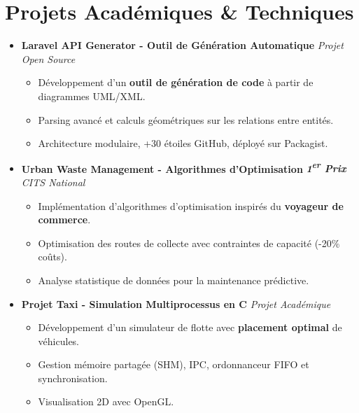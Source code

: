 \documentclass[a4paper,11pt]{article}
\begin{document}
\section{Projets Académiques \& Techniques}
\begin{itemize}[leftmargin=*, label={}]

\item \textbf{Laravel API Generator - Outil de Génération Automatique} \hfill \textit{Projet Open Source}
\vspace{-2pt}
    \begin{itemize}[leftmargin=0.4cm, nosep, label=\tiny$\bullet$]
        \item \small{Développement d'un \textbf{outil de génération de code} à partir de diagrammes UML/XML.}
        \item \small{Parsing avancé et calculs géométriques sur les relations entre entités.}
        \item \small{Architecture modulaire, +30 étoiles GitHub, déployé sur Packagist.}
    \end{itemize}
    \vspace{3pt}

\item \textbf{Urban Waste Management - Algorithmes d'Optimisation} \hfill \textit{\textbf{1\textsuperscript{er} Prix} CITS National}
\vspace{-2pt}
    \begin{itemize}[leftmargin=0.4cm, nosep, label=\tiny$\bullet$]
        \item \small{Implémentation d'algorithmes d'optimisation inspirés du \textbf{voyageur de commerce}.}
        \item \small{Optimisation des routes de collecte avec contraintes de capacité (-20\% coûts).}
        \item \small{Analyse statistique de données pour la maintenance prédictive.}
    \end{itemize}
    \vspace{3pt}

\item \textbf{Projet Taxi - Simulation Multiprocessus en C} \hfill \textit{Projet Académique}
\vspace{-2pt}
    \begin{itemize}[leftmargin=0.4cm, nosep, label=\tiny$\bullet$]
        \item \small{Développement d'un simulateur de flotte avec \textbf{placement optimal} de véhicules.}
        \item \small{Gestion mémoire partagée (SHM), IPC, ordonnanceur FIFO et synchronisation.}
        \item \small{Visualisation 2D avec OpenGL.}
    \end{itemize}
    \vspace{3pt}


\end{itemize}
\end{document}
